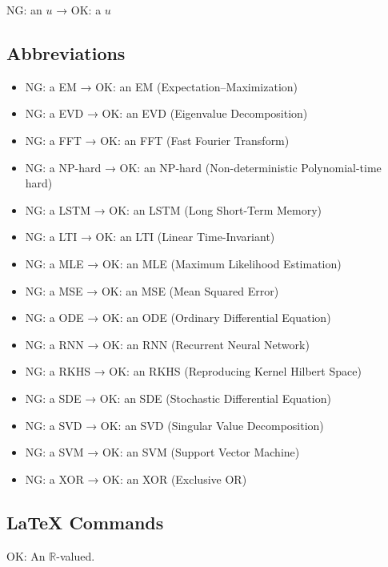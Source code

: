 \documentclass[a4paper]{article}
\begin{document}
NG: an \(u\) → OK: a \(u\)

\subsection{Abbreviations}

\begin{itemize}
	\item NG: a EM → OK: an EM (Expectation--Maximization)
	\item NG: a EVD → OK: an EVD (Eigenvalue Decomposition)
	\item NG: a FFT → OK: an FFT (Fast Fourier Transform)
	\item NG: a NP-hard → OK: an NP-hard (Non-deterministic Polynomial-time hard)
	\item NG: a LSTM → OK: an LSTM (Long Short-Term Memory)
	\item NG: a LTI → OK: an LTI (Linear Time-Invariant)
	\item NG: a MLE → OK: an MLE (Maximum Likelihood Estimation)
	\item NG: a MSE → OK: an MSE (Mean Squared Error)
	\item NG: a ODE → OK: an ODE (Ordinary Differential Equation)
	\item NG: a RNN → OK: an RNN (Recurrent Neural Network)
	\item NG: a RKHS → OK: an RKHS (Reproducing Kernel Hilbert Space)
	\item NG: a SDE → OK: an SDE (Stochastic Differential Equation)
	\item NG: a SVD → OK: an SVD (Singular Value Decomposition)
	\item NG: a SVM → OK: an SVM (Support Vector Machine)
	\item NG: a XOR → OK: an XOR (Exclusive OR)
\end{itemize}

\subsection{LaTeX Commands}

OK: An $\mathbb{R}$-valued.
\end{document}
